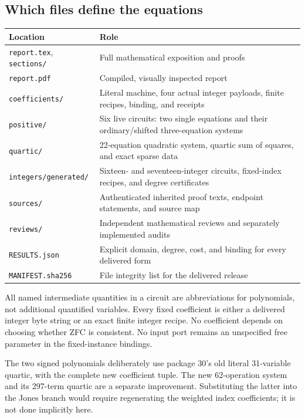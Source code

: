\subsection{Which files define the equations}

\begin{center}\small
\begin{tabular}{@{}p{}p{}@{}}\toprule
Location & Role\\\midrule
\texttt{report.tex}, \texttt{sections/} & Full mathematical exposition and proofs\\
\texttt{report.pdf} & Compiled, visually inspected report\\
\texttt{coefficients/} & Literal machine, four actual integer payloads, finite recipes, binding, and receipts\\
\texttt{positive/} & Six live circuits: two single equations and their ordinary/shifted three-equation systems\\
\texttt{quartic/} & 22-equation quadratic system, quartic sum of squares, and exact sparse data\\
\texttt{integers/generated/} & Sixteen- and seventeen-integer circuits, fixed-index recipes, and degree certificates\\
\texttt{sources/} & Authenticated inherited proof texts, endpoint statements, and source map\\
\texttt{reviews/} & Independent mathematical reviews and separately implemented audits\\
\texttt{RESULTS.json} & Explicit domain, degree, cost, and binding for every delivered form\\
\texttt{MANIFEST.sha256} & File integrity list for the delivered release\\\bottomrule
\end{tabular}
\end{center}

All named intermediate quantities in a circuit are abbreviations for
polynomials, not additional quantified variables. Every fixed coefficient
is either a delivered integer byte string or an exact finite integer
recipe. No coefficient depends on choosing whether ZFC is consistent.
No input port remains an unspecified free parameter in the fixed-instance
bindings.

The two signed polynomials deliberately use package 30's old literal
31-variable quartic, with the complete new coefficient tuple. The new
62-operation system and its 297-term quartic are a separate improvement.
Substituting the latter into the Jones branch would require regenerating
the weighted index coefficients; it is not done implicitly here.

